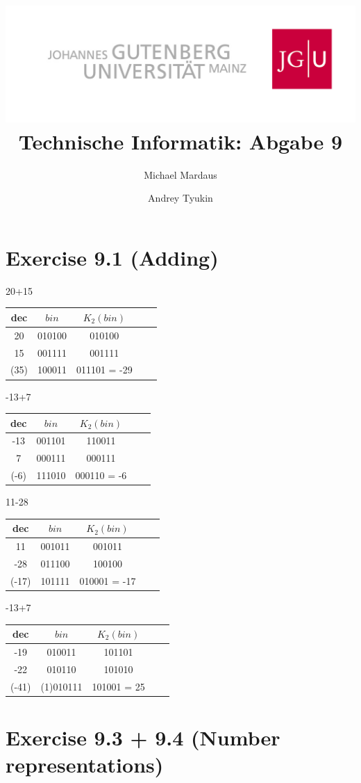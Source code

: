 \documentclass[10pt,a4paper]{scrartcl}
\author{Michael Mardaus \and Andrey Tyukin}
\title{\includegraphics[scale=0.2]{../logo_schriftzug}\\
Technische Informatik: Abgabe 9}
\newcommand{\subExercise}[1]{\vspace{0.5em} \noindent{\bf #1)}}
\begin{document}
\maketitle

\section*{Exercise 9.1 (Adding)}


\subExercise{a}
20+15
\begin{tabular}{|c|c|c|c|c|}
  \hline
dec& $bin$   & $K_2(bin)$  \\\hline
20 & 010100  & 010100 \\          
15 & 001111  & 001111 \\
\hline\hline
(35) & 100011 & 011101 = -29 \\\hline
\end{tabular}

\subExercise{b}
-13+7
\begin{tabular}{|c|c|c|c|c|}
  \hline
dec& $bin$   & $K_2(bin)$  \\\hline
-13 & 001101 & 110011 \\          
7 & 000111   & 000111 \\
\hline\hline
(-6) & 111010 & 000110 = -6 \\\hline
\end{tabular}

\subExercise{c}
11-28
\begin{tabular}{|c|c|c|c|c|}
  \hline
dec& $bin$   & $K_2(bin)$  \\\hline
11 & 001011 & 001011 \\          
-28 & 011100 & 100100 \\
\hline\hline
(-17) & 101111 & 010001 = -17 \\\hline
\end{tabular}

\subExercise{d}
-13+7
\begin{tabular}{|c|c|c|c|c|}
  \hline
dec& $bin$   & $K_2(bin)$  \\\hline
-19 & 010011 & 101101 \\          
-22 & 010110 & 101010 \\
\hline\hline
(-41) & (1)010111 & 101001 = 25 \\\hline
\end{tabular}
\FloatBarrier

\section*{Exercise 9.3 + 9.4 (Number representations)}
\end{document}
